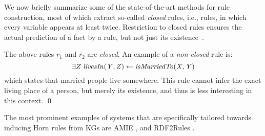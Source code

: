 We now briefly summarize some of the state-of-the-art methods %
for rule construction, most of which %
extract so-called \emph{closed} rules,
i.e., rules, in which every variable appears at least twice. Restriction to closed rules %
ensures the actual prediction  of a fact by a rule, but not just its existence~\cite{amie}.

\begin{example}
The above rules $r_1$ and $r_2$ are \textit{closed}. %
An example of a \emph{non-closed} rule is:
\[\exists Z\; \mathit{livesIn(Y,Z)} \leftarrow \mathit{isMarriedTo(X,Y)} \]  which states that married people 
live somewhere. This rule cannot infer the exact living place of a person, but merely its existence, and thus is less interesting in this context. \qed%
\end{example}

The most prominent examples of systems that are specifically tailored towards inducing Horn rules from KGs are AMIE \cite{amie}, %
and RDF2Rules \cite{rdf2rules}.
